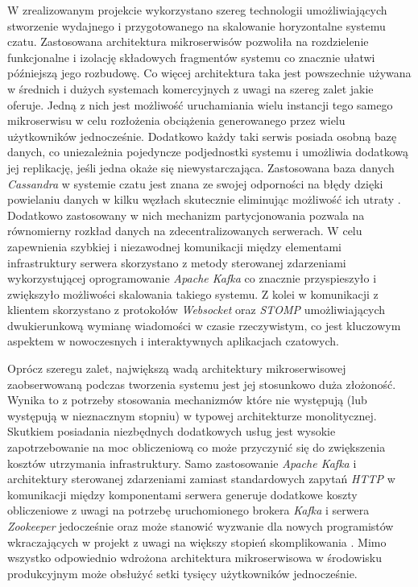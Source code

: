 
W zrealizowanym projekcie wykorzystano szereg technologii umożliwiających stworzenie wydajnego i przygotowanego na
skalowanie horyzontalne systemu czatu. Zastosowana architektura mikroserwisów pozwoliła na rozdzielenie funkcjonalne i
izolację składowych fragmentów systemu co znacznie ułatwi późniejszą jego rozbudowę. Co więcej architektura taka jest
powszechnie używana w średnich i dużych systemach komercyjnych z uwagi na szereg zalet jakie oferuje. Jedną z nich jest
możliwość uruchamiania wielu instancji tego samego mikroserwisu w celu rozłożenia obciążenia generowanego przez wielu
użytkowników jednocześnie. Dodatkowo każdy taki serwis posiada osobną bazę danych, co uniezależnia pojedyncze
podjednostki systemu i umożliwia dodatkową jej replikację, jeśli jedna okaże się niewystarczająca. Zastosowana baza
danych \textit{Cassandra} w systemie czatu jest znana ze swojej odporności na błędy dzięki powielaniu danych w kilku
węzłach skutecznie eliminując możliwość ich utraty \cite{bib:cassandra-overview}. Dodatkowo zastosowany w nich mechanizm
partycjonowania pozwala na równomierny rozkład danych na zdecentralizowanych serwerach. W celu zapewnienia szybkiej i
niezawodnej komunikacji między elementami infrastruktury serwera skorzystano z metody sterowanej zdarzeniami
wykorzystującej oprogramowanie \textit{Apache Kafka} co znacznie przyspieszyło i zwiększyło możliwości skalowania
takiego systemu. Z kolei w komunikacji z klientem skorzystano z protokołów \textit{Websocket} oraz \textit{STOMP}
umożliwiających dwukierunkową wymianę wiadomości w czasie rzeczywistym, co jest kluczowym aspektem w nowoczesnych i
interaktywnych aplikacjach czatowych.

Oprócz szeregu zalet, największą wadą architektury mikroserwisowej zaobserwowaną podczas tworzenia systemu jest jej
stosunkowo duża złożoność. Wynika to z potrzeby stosowania mechanizmów które nie występują (lub występują w nieznacznym
stopniu) w typowej architekturze monolitycznej. Skutkiem posiadania niezbędnych dodatkowych usług jest wysokie
zapotrzebowanie na moc obliczeniową co może przyczynić się do zwiększenia kosztów utrzymania infrastruktury. Samo
zastosowanie \textit{Apache Kafka} i architektury sterowanej zdarzeniami zamiast standardowych zapytań \textit{HTTP} w
komunikacji między komponentami serwera generuje dodatkowe koszty obliczeniowe z uwagi na potrzebę uruchomionego brokera
\textit{Kafka} i serwera \textit{Zookeeper} jedocześnie oraz może stanowić wyzwanie dla nowych programistów
wkraczających w projekt z uwagi na większy stopień skomplikowania \cite{bib:kafka-overview}. Mimo wszystko odpowiednio
wdrożona architektura mikroserwisowa w środowisku produkcyjnym może obsłużyć setki tysięcy użytkowników jednocześnie.


